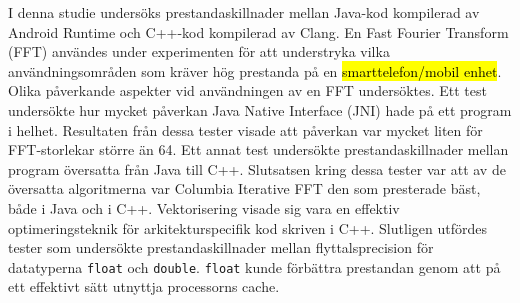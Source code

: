 I denna studie undersöks prestandaskillnader mellan Java-kod kompilerad av Android Runtime och C++-kod kompilerad av Clang. En Fast Fourier Transform (FFT) användes under experimenten för att understryka vilka användningsområden som kräver hög prestanda på en \hl{smarttelefon/mobil enhet}. Olika påverkande aspekter vid användningen av en FFT undersöktes. Ett test undersökte hur mycket påverkan Java Native Interface (JNI) hade på ett program i helhet. Resultaten från dessa tester visade att påverkan var mycket liten för FFT-storlekar större än 64. Ett annat test undersökte prestandaskillnader mellan program översatta från Java till C++. Slutsatsen kring dessa tester var att av de översatta algoritmerna var Columbia Iterative FFT den som presterade bäst, både i Java och i C++. Vektorisering visade sig vara en effektiv optimeringsteknik för arkitekturspecifik kod skriven i C++. Slutligen utfördes tester som undersökte prestandaskillnader mellan flyttalsprecision för datatyperna \texttt{float} och \texttt{double}. \texttt{float} kunde förbättra prestandan genom att på ett effektivt sätt utnyttja processorns cache.
